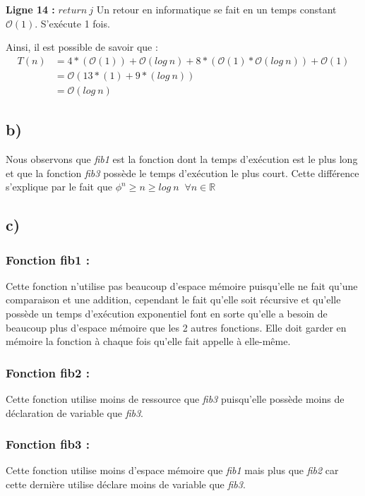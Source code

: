\documentclass[12pt]{article}
\begin{document}
        \noindent \textbf{Ligne 14 :} \( return \: j \) \newline
  	    Un retour en informatique se fait en un temps constant
        \( \mathcal{O}(1) \). \newline
		S'exécute 1 fois. \newline

        \noindent Ainsi, il est possible de savoir que :
	    \begin{align*}
	       T(n) &= 4*(\mathcal{O}(1))+\mathcal{O}(log \: n)+8*( \mathcal{O}(1)*\mathcal{O}(log \: n)) + \mathcal{O}(1) \\
	   	   &= \mathcal{O}(13*(1)+9*(log \: n)) \\
	       &= \mathcal{O}(log \: n)
	    \end{align*}
  	\newpage
    \subsection*{b)}
      \noindent Nous observons que \textit{fib1} est la fonction dont la temps d'exécution est le plus long et que la fonction \textit{fib3} possède le temps d'exécution le plus court. Cette différence s'explique par le fait que \( \phi^n \geq n \geq log \: n  \; \; \forall n \in \mathbb{R} \)
    \subsection*{c)}
	  \subsubsection*{Fonction fib1 :}
      \noindent Cette fonction n'utilise pas beaucoup d'espace mémoire puisqu'elle ne fait qu'une comparaison et une addition, cependant le fait qu'elle soit récursive et qu'elle possède un temps d'exécution exponentiel font en sorte qu'elle a besoin de beaucoup plus d'espace mémoire que les 2 autres fonctions. Elle doit garder en mémoire la fonction à chaque fois qu'elle fait appelle à elle-même.
      \subsubsection*{Fonction fib2 :}
      \noindent Cette fonction utilise moins de ressource que \textit{fib3} puisqu'elle possède moins de déclaration de variable que \textit{fib3}.
      \subsubsection*{Fonction fib3 :}
      \noindent Cette fonction utilise moins d'espace mémoire que \textit{fib1} mais plus que \textit{fib2} car cette dernière utilise déclare moins de variable que \textit{fib3}.
\end{document}
